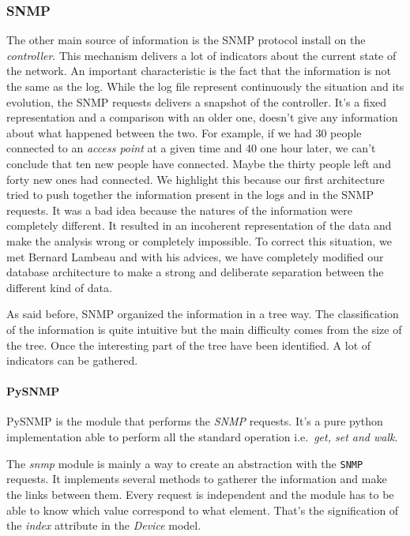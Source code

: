 \subsubsection{SNMP}
The other main source of information is the SNMP protocol install on the \emph{controller}. This mechanism delivers a lot of indicators about the current state of the network. An important characteristic is the fact that the information is not the same as the log. While the log file represent continuously the situation and its evolution, the SNMP requests delivers a snapshot of the controller. It's a fixed representation and a comparison with an older one, doesn't give any information about what happened between the two. For example, if we had 30 people connected to an \emph{access point} at a given time and 40 one hour later, we can't conclude that ten new people have connected. Maybe the thirty people left and forty new ones had connected. We highlight this because our first architecture tried to push together the information present in the logs and in the SNMP requests. It was a bad idea because the natures of the information were completely different. It resulted in an incoherent representation of the data and make the analysis wrong or completely impossible. To correct this situation, we met Bernard Lambeau and with his advices, we have completely modified our database architecture to make a strong and deliberate separation between the different kind of data.

As said before, SNMP organized the information in a tree way. The classification of the information is quite intuitive but the main difficulty comes from the size of the tree. Once the interesting part of the tree have been identified. A lot of indicators can be gathered.

\paragraph{PySNMP} PySNMP is the module that performs the \emph{SNMP} requests. It's a pure python implementation able to perform all the standard operation i.e.\  \emph{get, set and walk}.

The \emph{snmp} module is mainly a way to create an abstraction with the \texttt{SNMP} requests. It implements several methods to gatherer the information and make the links between them. Every request is independent and the module has to be able to know which value correspond to what element. That's the signification of the \emph{index} attribute in the \emph{Device} model.

